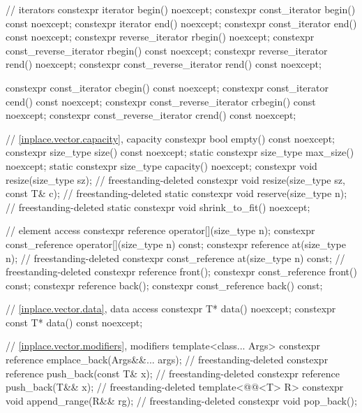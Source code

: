 \begin{codeblock}
{{    // iterators
    constexpr iterator               begin()         noexcept;
    constexpr const_iterator         begin()   const noexcept;
    constexpr iterator               end()           noexcept;
    constexpr const_iterator         end()     const noexcept;
    constexpr reverse_iterator       rbegin()        noexcept;
    constexpr const_reverse_iterator rbegin()  const noexcept;
    constexpr reverse_iterator       rend()          noexcept;
    constexpr const_reverse_iterator rend()    const noexcept;

    constexpr const_iterator         cbegin()  const noexcept;
    constexpr const_iterator         cend()    const noexcept;
    constexpr const_reverse_iterator crbegin() const noexcept;
    constexpr const_reverse_iterator crend()   const noexcept;

    // \ref{inplace.vector.capacity}, capacity
    constexpr bool empty() const noexcept;
    constexpr size_type size() const noexcept;
    static constexpr size_type max_size() noexcept;
    static constexpr size_type capacity() noexcept;
    constexpr void resize(size_type sz);                                    // freestanding-deleted
    constexpr void resize(size_type sz, const T& c);                        // freestanding-deleted
    static constexpr void reserve(size_type n);                             // freestanding-deleted
    static constexpr void shrink_to_fit() noexcept;

    // element access
    constexpr reference       operator[](size_type n);
    constexpr const_reference operator[](size_type n) const;
    constexpr reference       at(size_type n);                              // freestanding-deleted
    constexpr const_reference at(size_type n) const;                        // freestanding-deleted
    constexpr reference       front();
    constexpr const_reference front() const;
    constexpr reference       back();
    constexpr const_reference back() const;

    // \ref{inplace.vector.data}, data access
    constexpr       T* data()       noexcept;
    constexpr const T* data() const noexcept;

    // \ref{inplace.vector.modifiers}, modifiers
    template<class... Args>
      constexpr reference emplace_back(Args&&... args);                     // freestanding-deleted
    constexpr reference push_back(const T& x);                              // freestanding-deleted
    constexpr reference push_back(T&& x);                                   // freestanding-deleted
    template<@@<T> R>
      constexpr void append_range(R&& rg);                                  // freestanding-deleted
    constexpr void pop_back();

}}
\end{codeblock}
